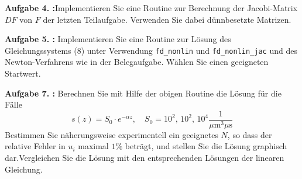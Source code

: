 \begin{mybox}
	\textbf{Aufgabe 4. :}Implementieren Sie eine Routine zur Berechnung der
	Jacobi-Matrix $DF$ von $F$ der letzten Teilaufgabe.
	Verwenden Sie dabei dünnbesetzte Matrizen.
\end{mybox}



\begin{mybox}
	\textbf{Aufgabe 5. :}
	Implementieren Sie eine Routine zur Lösung des Gleichungssystems (8)
	unter Verwendung \verb*|fd_nonlin|
	und \verb*|fd_nonlin_jac| und des Newton-Verfahrens wie in der
	Belegaufgabe. Wählen Sie einen geeigneten
	Startwert.
\end{mybox}


\begin{mybox}
	\textbf{Aufgabe 7. :}	Berechnen Sie mit Hilfe der obigen Routine die
	Lösung für die Fälle
	\begin{equation}
		s(z)=S_0\cdot e^{-\alpha z}, \quad S_0=10^2, \, 10^2, \, 10^4
		\frac{1}{\si{\mu\meter^3 \mu \s}}
	\end{equation}
	Bestimmen Sie näherungsweise experimentell ein geeignetes $N$, so dass
	der relative Fehler in $u_i$
	maximal $1\%$ beträgt, und stellen Sie die Lösung graphisch
	dar.Vergleichen Sie die Lösung mit den
	entsprechenden Lösungen der linearen Gleichung.
\end{mybox}